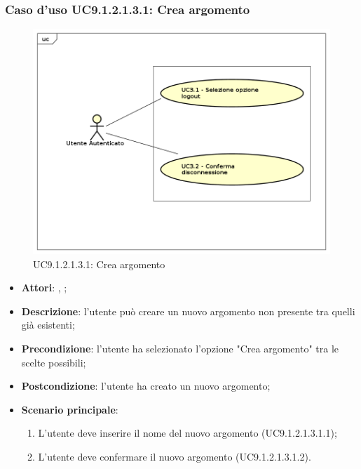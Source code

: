 						\subsubsection{Caso d'uso UC9.1.2.1.3.1: Crea argomento}
						\label{UC9.1.2.1.3.1}
						\begin{figure}[h]
							\centering
						\includegraphics[scale=0.5,keepaspectratio]{UML/UC9.png}
							\caption{UC9.1.2.1.3.1: Crea argomento}
						\end{figure}
						\FloatBarrier
						\begin{itemize}
							\item \textbf{Attori}: \uau, \uaupro;
							\item \textbf{Descrizione}: l'utente può creare un nuovo argomento non presente tra quelli già esistenti;
							\item \textbf{Precondizione}: l'utente ha selezionato l'opzione "Crea argomento" tra le scelte possibili;
							\item \textbf{Postcondizione}: l'utente ha creato un nuovo argomento; 
							\item \textbf{Scenario principale}:
								\begin{enumerate}
									\item L'utente deve inserire il nome del nuovo argomento (UC9.1.2.1.3.1.1);
									\item L'utente deve confermare il nuovo argomento (UC9.1.2.1.3.1.2).
								\end{enumerate}
						\end{itemize}
						

